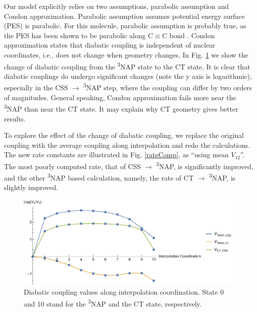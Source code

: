 Our model explicitly relies on two assumptions, parabolic assumption and Condon approximation. Parabolic assumption assumes potential energy surface (PES) is parabolic. For this molecule, parabolic assumption is probably true, as the PES has been shown to be parabolic along C$\equiv$C bond \cite{delor2014toward,delor2015mechanism}. Condon approximation states that diabatic coupling is independent of nuclear coordinates, i.e., does not change when geometry changes. In Fig. \ref{interCondon} we show the change of diabatic coupling from the \textsuperscript{3}NAP state to the CT state. It is clear that diabatic couplings do undergo significant changes (note the y axis is logarithmic), especially in the CSS $\rightarrow$ \textsuperscript{3}NAP step, where the coupling can differ by two orders of magnitudes. General speaking, Condon approximation fails more near the \textsuperscript{3}NAP than near the CT state. It may explain why CT geometry gives better results.

To explore the effect of the change of diabatic coupling, we replace the original coupling with the average coupling along interpolation and redo the calculations. The new rate constants are illustrated in Fig. \ref{rateComp}, as ``using mean $V_{12}$''. The most poorly computed rate, that of CSS $\rightarrow$ \textsuperscript{3}NAP, is significantly improved, and the other \textsuperscript{3}NAP based calculation, namely, the rate of CT $\rightarrow$ \textsuperscript{3}NAP, is slightly improved.

\begin{figure}[!h]
\includegraphics[width=\columnwidth]{Chapters/chap4/Images/interpolation.pdf}
\caption{Diabatic coupling values along interpolation coordination. State 0 and 10 stand for the \textsuperscript{3}NAP and the CT state, respectively.\label{interCondon}}
\end{figure}

